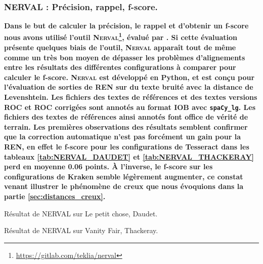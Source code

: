 \subsubsection{\textsc{NERVAL} : Précision, rappel, f-score.}
\label{subsec:NERVAL_COR-OCR-IMPACT-NER}
\textbf{Dans le but de calculer la précision, le rappel et d'obtenir un f-score nous avons utilisé l'outil \textsc{Nerval}\footnote{\url{https://gitlab.com/teklia/nerval}}, évalué par \cite{koudoro2022reconnaissance}. Si cette évaluation présente quelques biais de l'outil, \textsc{Nerval} apparaît tout de même comme un très bon moyen de dépasser les problèmes d'alignements entre les résultats des différentes configurations à comparer pour calculer le f-score. \textsc{Nerval} est développé en Python, et est conçu pour l'évaluation de sorties de REN sur du texte bruité avec la distance de Levenshtein. Les fichiers des textes de références et des textes versions ROC et ROC corrigées sont annotés au format IOB avec \texttt{spaCy\_lg}. Les fichiers des textes de références ainsi annotés font office de vérité de terrain.
Les premières observations des résultats semblent confirmer que la correction automatique n'est pas forcément un gain pour la REN, en effet le f-score pour les configurations de Tesseract dans les tableaux \ref{tab:NERVAL_DAUDET} et \ref{tab:NERVAL_THACKERAY} perd en moyenne 0.06 points. À l'inverse, le f-score sur les configurations de Kraken semble légèrement augmenter, ce constat venant illustrer le phénomène de creux que nous évoquions dans la partie \ref{sec:distances_creux}.}

\begin{table}[h!]
     \centering

     \caption{Résultat de \textsc{NERVAL} sur {\normalfont Le petit chose}, Daudet.}
     \label{tab:NERVAL_DAUDET}
 \end{table}

   \begin{table}[h!]
     \centering

     \caption{Résultat de \textsc{NERVAL} sur {\normalfont Vanity Fair}, Thackeray.}
     \label{tab:NERVAL_THACKERAY}
 \end{table}

